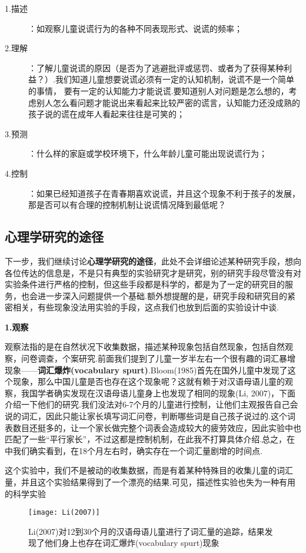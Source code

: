 \begin{description}
    \item[1.描述]：如观察儿童说谎行为的各种不同表现形式、说谎的频率；
    \item[2.理解]：了解儿童说谎的原因（是否为了逃避批评或惩罚、或者为了获得某种利益？）.我们知道儿童想要说谎必须有一定的认知机制，说谎不是一个简单的事情， 要有一定的认知能力才能说谎.要知道别人对问题是怎么想的，考虑别人怎么看问题才能说出来看起来比较严密的谎言，认知能力还没成熟的孩子说的谎在成年人看起来往往是可笑的；
    \item[3.预测]：什么样的家庭或学校环境下，什么年龄儿童可能出现说谎行为；
    \item[4.控制]：如果已经知道孩子在青春期喜欢说谎，并且这个现象不利于孩子的发展，那是否可以有合理的控制机制让说谎情况降到最低呢？
\end{description}


\subsection{心理学研究的途径}

下一步，我们继续讨论\textbf{心理学研究的途径}，此处不会详细论述某种研究手段，想向各位传达的信息是，不是只有典型的实验研究才是研究，别的研究手段尽管没有对实验条件进行严格的控制，但这些手段都是科学的，都是为了一定的研究目的服务，也会进一步深入问题提供一个基础.额外想提醒的是，研究手段和研究目的紧密相关，有些现象没法用实验的手段，这点我们也放到后面的实验设计中谈.

\textbf{1.观察}

观察法指的是在自然状况下收集数据，描述某种现象包括自然现象，包括自然观察，问卷调查，个案研究.前面我们提到了儿童一岁半左右一个很有趣的词汇暴增现象——\textbf{词汇爆炸(vocabulary spurt)}.Bloom(1985)首先在国外儿童中发现了这个现象，那么中国儿童是否也存在这个现象呢？这就有赖于对汉语母语儿童的观察，我国学者确实发现在汉语母语儿童身上也发现了相同的现象(Li, 2007)，下面介绍一下他们的研究.我们没法对6-7个月的儿童进行控制，让他们主观报告自己会说的词汇，因此只能让家长填写词汇问卷，判断哪些词是自己孩子说过的.这个词表数目还挺多的，让一个家长做完整个词表会造成较大的疲劳效应，因此实验中也匹配了一些“平行家长”，不过这都是控制机制，在此我不打算具体介绍.总之，在中我们确实看到，在18个月左右时，确实存在一个词汇量剧增的时间点.

这个实验中，我们不是被动的收集数据，而是有着某种特殊目的收集儿童的词汇量，并且这个实验结果得到了一个漂亮的结果.可见，描述性实验也失为一种有用的科学实验

\begin{figure}
    \texttt{[image: Li(2007)]}
    \caption{Li(2007)对12到30个月的汉语母语儿童进行了词汇量的追踪，结果发现了他们身上也存在词汇爆炸(vocabulary spurt)现象}
\end{figure}

